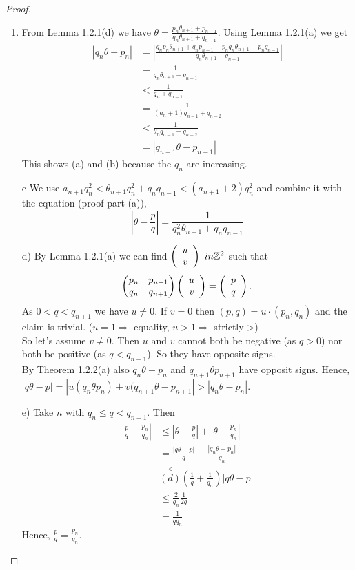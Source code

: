 \documentclass[NumTh.tex]{subfiles}
\begin{document}
\begin{proof}
  \begin{enumerate}
    \item From Lemma 1.2.1(d) we have $\theta = \frac{p_n \theta_{n+1} + p_{n-1}}{q_n \theta_{n+1} + q_{n-1}}$.
    Using Lemma 1.2.1(a) we get
    \begin{align}
    |q_n \theta - p_n| &= |\frac{q_n p_n \theta_{n+1} + q_n p_{n-1} - p_n q_n \theta_{n+1} - p_n q_{n-1}}{q_n \theta_{n+1} + q_{n-1}}| \\
    &= \frac{1}{q_n \theta_{n+1} + q_{n-1}}\\
    &< \frac{1}{q_n + q_{n-1}}\\
    &= \frac{1}{(a_n +1) q_{n-1} + q_{n-2}}\\
    &< \frac{1}{\theta_n q_{n-1} + q_{n-2}}\\
    &= | q_{n-1} \theta - p_{n-1}|
    \end{align}
    This shows (a) and (b) because the $q_n$ are increasing.
    \item[c] We use $a_{n+1} q_n^2 < \theta_{n+1} q_n^2 + q_n q_{n-1} < (a_{n+1} + 2) q_n^2$
    and combine it with the equation (proof part (a)),
    \[ |\theta - \frac{p}{q}| = \frac{1}{q_n^2 \theta_{n+1} + q_n q_{n-1}} \]
    
    
    \item[d)] By Lemma 1.2.1(a) we can find $\Vek{u}{v}{} \ in \Z^2$ such that
    \[ \left(\begin{matrix} p_n & p_{n+1}\\ q_n & q_{n+1} \end{matrix} \right) \Vek{u}{v}{} = \Vek{p}{q}{}. \]
    As $0 < q <q_{n+1}$ we have $u \neq 0$. If $v = 0$ then $(p,q) = u \cdot (p_n,q_n)$ and the claim is trivial. ($u = 1 \Rightarrow$ equality, $u > 1 \Rightarrow$ strictly >)\\
    So let's assume $v \neq 0$. Then $u$ and $v$ cannot both be negative (as $q > 0$) nor both be positive (as $q < q_{n+1}$).
    So they have opposite signs.\\
    By Theorem 1.2.2(a) also $q_n\theta - p_n$ and $q_{n+1} \theta p_{n+1}$ have opposit signs.
    Hence, $|q \theta - p| = |u (q_n \theta p_n) + v (q_{n+1} \theta - p_{n+1}| > |q_n \theta - p_n|$.
    \item[e)] Take $n$ with $q_n \leq q < q_{n+1}$. Then 
    \begin{align*} 
    |\frac{p}{q} - \frac{p_n}{q_n}| &\leq |\theta - \frac{p}{q}| + |\theta - \frac{p_n}{q_n}| \\
    &= \frac{|q \theta - p|}{q} + \frac{|q_n \theta - p_n|}{q_n}\\
    &\overset{\leq}{(d)} (\frac{1}{q} + \frac{1}{q_n}) |q \theta - p | \\
    &\leq \frac{2}{q_n} \frac{1}{2q} \\
    &= \frac{1}{q q_n}
    \end{align*}
    Hence, $\frac{p}{q} = \frac{p_n}{q_n}$.
  \end{enumerate}
\end{proof}
\end{document}
